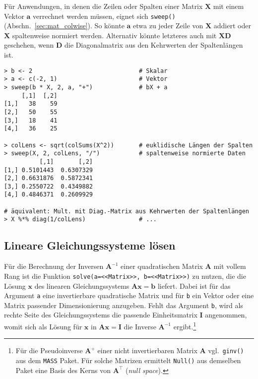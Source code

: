 Für Anwendungen, in denen die Zeilen oder Spalten einer Matrix $\bm{X}$ mit einem Vektor $\bm{a}$ verrechnet werden müssen, eignet sich \lstinline!sweep()! (Abschn.\ \ref{sec:mat_colwise}). So könnte $\bm{a}$ etwa zu jeder Zeile von $\bm{X}$ addiert oder $\bm{X}$ spaltenweise normiert werden. Alternativ könnte letzteres auch mit $\bm{X} \bm{D}$ geschehen, wenn $\bm{D}$ die Diagonalmatrix aus den Kehrwerten der Spaltenlängen ist.
\begin{lstlisting}
> b <- 2                              # Skalar
> a <- c(-2, 1)                       # Vektor
> sweep(b * X, 2, a, "+")             # bX + a
     [,1]  [,2]
[1,]   38    59
[2,]   50    55
[3,]   18    41
[4,]   36    25

> colLens <- sqrt(colSums(X^2))       # euklidische Längen der Spalten
> sweep(X, 2, colLens, "/")           # spaltenweise normierte Daten
          [,1]       [,2]
[1,] 0.5101443  0.6307329
[2,] 0.6631876  0.5872341
[3,] 0.2550722  0.4349882
[4,] 0.4846371  0.2609929

# äquivalent: Mult. mit Diag.-Matrix aus Kehrwerten der Spaltenlängen
> X %*% diag(1/colLens)               # ...
\end{lstlisting}

\subsection{Lineare Gleichungssysteme lösen}
\label{sec:matSolve}

Für die Berechnung der Inversen $\bm{A}^{-1}$ einer quadratischen Matrix $\bm{A}$ mit vollem Rang ist die Funktion \lstinline!solve(a=<<Matrix>>, b=<<Matrix>>)! zu nutzen, die die Lösung $\bm{x}$ des linearen Gleichungssystems $\bm{A} \bm{x} = \bm{b}$ liefert. Dabei ist für das Argument \lstinline!a! eine invertierbare quadratische Matrix und für \lstinline!b! ein Vektor oder eine Matrix passender Dimensionierung anzugeben. Fehlt das Argument \lstinline!b!, wird als rechte Seite des Gleichungssystems die passende Einheitsmatrix $\bm{I}$ angenommen, womit sich als Lösung für $\bm{x}$ in $\bm{A} \bm{x} = \bm{I}$ die Inverse $\bm{A}^{-1}$ ergibt.\footnote{Für die Pseudoinverse $\bm{A}^{+}$ einer nicht invertierbaren Matrix $\bm{A}$ vgl.\ \lstinline!ginv()! aus dem \lstinline!MASS! Paket. Für solche Matrizen ermittelt \lstinline!Null()! aus demselben Paket eine Basis des Kerns von $\bm{A}^{\top}$ (\emph{null space}).}


